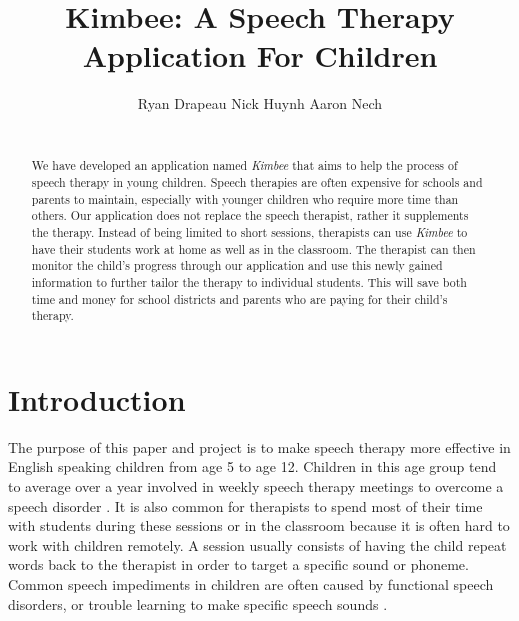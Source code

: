\documentclass{sig-alternate-2013}
\begin{document}
\title{Kimbee: A Speech Therapy Application For Children}

\author{
    \alignauthor
    \vspace*{-0.3in}
        Ryan Drapeau \hspace{3.0cm}
        Nick Huynh \hspace{3.0cm}
        Aaron Nech \\
     \\[7 pt]
}

\maketitle

\begin{abstract}

We have developed an application named {\em Kimbee} that aims to help the process of speech therapy in young children. Speech therapies are often expensive for schools and parents to maintain, especially with younger children who require more time than others. Our application does not replace the speech therapist, rather it supplements the therapy. Instead of being limited to short sessions, therapists can use {\em Kimbee} to have their students work at home as well as in the classroom. The therapist can then monitor the child's progress through our application and use this newly gained information to further tailor the therapy to individual students. This will save both time and money for school districts and parents who are paying for their child's therapy.

\end{abstract}

\section{Introduction}

The purpose of this paper and project is to make speech therapy more effective in English speaking children from age 5 to age 12. Children in this age group tend to average over a year involved in weekly speech therapy meetings to overcome a speech disorder \cite{Kreider:Intro}. It is also common for therapists to spend most of their time with students during these sessions or in the classroom because it is often hard to work with children remotely. A session usually consists of having the child repeat words back to the therapist in order to target a specific sound or phoneme. Common speech impediments in children are often caused by functional speech disorders, or trouble learning to make specific speech sounds \cite{Brown:Children}.
\end{document}
